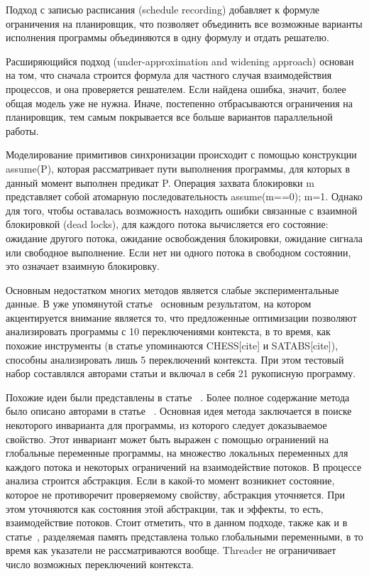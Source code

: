 Подход с записью расписания (schedule recording) добавляет к формуле ограничения на планировщик, что позволяет объединить все возможные варианты исполнения программы объединяются в одну формулу и отдать решателю.

Расширяющийся подход (under-approximation and widening approach) основан на том, что сначала строится формула для частного случая взаимодействия процессов, и она проверяется решателем. Если найдена ошибка, значит, более общая модель уже не нужна. Иначе, постепенно отбрасываются ограничения на планировщик, тем самым покрывается все больше вариантов параллельной работы. 

Моделирование примитивов синхронизации происходит с помощью конструкции assume(P), которая рассматривает пути выполнения программы, для которых в данный момент выполнен предикат P. Операция захвата блокировки m представляет собой атомарную последовательность assume(m==0); m=1. Однако для того, чтобы оставалась возможность находить ошибки связанные с взаимной блокировкой (dead locks), для каждого потока вычисляется его состояние: ожидание другого потока, ожидание освобождения блокировки, ожидание сигнала или свободное выполнение. Если нет ни одного потока в свободном состоянии, это означает взаимную блокировку.

Основным недостатком многих методов является слабые экспериментальные данные. В уже упомянутой статье~\cite{Cordeiro:2011} основным результатом, на котором акцентируется внимание является то, что предложенные оптимизации позволяют анализировать программы с 10 переключениями контекста, в то время, как похожие инструменты (в статье упоминаются CHESS[cite] и SATABS[cite]), способны анализировать лишь 5 переключений контекста. При этом тестовый набор составлялся авторами статьи и включал в себя 21 рукописную программу. 

Похожие идеи были представлены в статье ~\cite{Threader:2011}. Более полное содержание метода было описано авторами в статье ~\cite{Gupta:2011:POPL,Gupta:2011}. 
Основная идея метода заключается в поиске некоторого инварианта для программы, из которого следует доказываемое свойство. Этот инвариант может быть выражен с помощью ограниений на глобальные переменные программы, на множество локальных переменных для каждого потока и некоторых ограничений на взаимодействие потоков. В процессе анализа строится абстракция. Если в какой-то момент возникнет состояние, которое не противоречит проверяемому свойству, абстракция уточняется. При этом уточняются как состояния этой абстракции, так и эффекты, то есть, взаимодействие потоков. Стоит отметить, что в данном подходе, также как и в статье~\cite{Cordeiro:2011}, разделяемая память представлена только глобальными переменными, в то время как указатели не рассматриваются вообще. Threader не ограничивает число возможных переключений контекста.

